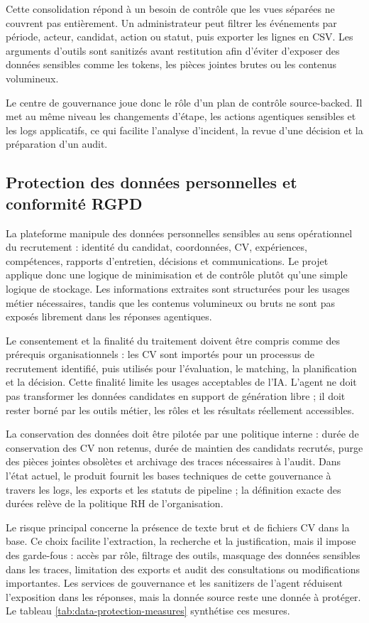 Cette consolidation répond à un besoin de contrôle que les vues séparées ne couvrent pas entièrement. Un administrateur peut filtrer les événements par période, acteur, candidat, action ou statut, puis exporter les lignes en CSV. Les arguments d'outils sont sanitizés avant restitution afin d'éviter d'exposer des données sensibles comme les tokens, les pièces jointes brutes ou les contenus volumineux.

Le centre de gouvernance joue donc le rôle d'un plan de contrôle source-backed. Il met au même niveau les changements d'étape, les actions agentiques sensibles et les logs applicatifs, ce qui facilite l'analyse d'incident, la revue d'une décision et la préparation d'un audit.

\subsection{Protection des données personnelles et conformité RGPD}
La plateforme manipule des données personnelles sensibles au sens opérationnel du recrutement : identité du candidat, coordonnées, CV, expériences, compétences, rapports d'entretien, décisions et communications. Le projet applique donc une logique de minimisation et de contrôle plutôt qu'une simple logique de stockage. Les informations extraites sont structurées pour les usages métier nécessaires, tandis que les contenus volumineux ou bruts ne sont pas exposés librement dans les réponses agentiques.

Le consentement et la finalité du traitement doivent être compris comme des prérequis organisationnels : les CV sont importés pour un processus de recrutement identifié, puis utilisés pour l'évaluation, le matching, la planification et la décision. Cette finalité limite les usages acceptables de l'IA. L'agent ne doit pas transformer les données candidates en support de génération libre ; il doit rester borné par les outils métier, les rôles et les résultats réellement accessibles.

La conservation des données doit être pilotée par une politique interne : durée de conservation des CV non retenus, durée de maintien des candidats recrutés, purge des pièces jointes obsolètes et archivage des traces nécessaires à l'audit. Dans l'état actuel, le produit fournit les bases techniques de cette gouvernance à travers les logs, les exports et les statuts de pipeline ; la définition exacte des durées relève de la politique RH de l'organisation.

Le risque principal concerne la présence de texte brut et de fichiers CV dans la base. Ce choix facilite l'extraction, la recherche et la justification, mais il impose des garde-fous : accès par rôle, filtrage des outils, masquage des données sensibles dans les traces, limitation des exports et audit des consultations ou modifications importantes. Les services de gouvernance et les sanitizers de l'agent réduisent l'exposition dans les réponses, mais la donnée source reste une donnée à protéger. Le tableau \ref{tab:data-protection-measures} synthétise ces mesures.

